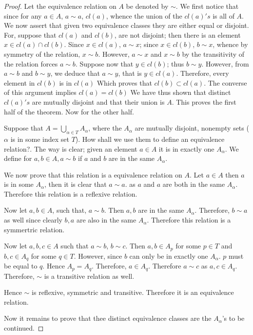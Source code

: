 \begin{proof}
 Let the equivalence relation on \( A  \) be denoted by \( \sim  \). We first notice that since for any \( a \in A  \), \( a \sim  a \), \( cl(a) \), whence the union of the \( cl(a)'s \) is all of \( A \).
 We now assert that given two equivalence classes they are either equal or disjoint. For, suppose that \( cl(a) \) and \( cl(b)  \), are not disjoint; then there is an element \( x \in  cl(a) \cap cl(b)\). Since
 \( x \in  cl(a) \), \( a \sim x  \); since \( x \in  cl(b) \), \( b \sim x \), whence by symmetry of the relation, \( x \sim  b \). However, \( a \sim  x \) and \( x \sim b \) by the transitivity of the relation forces \( a \sim b \). Suppose
now that \( y \in  cl(b) \); thus \( b \sim y \). However, from \( a \sim  b \) and \( b \sim  y \), we deduce that \( a \sim  y \), that is \( y \in   cl(a) \). Therefore, every element in \( cl(b) \) is in \( cl(a) \)
Which proves that \( cl(b) \subset cl(a) \). The converse of this argument implies \( cl(a) = cl(b) \)
We have thus shown that distinct \( cl(a)'s \) are mutually disjoint and that
their union is \( A \). This proves the first half of the theorem. Now for the other half.

Suppose that \( A = \bigcup_{\alpha  \in  T} A_{\alpha}  \), where the \( A_{\alpha } \) are mutually disjoint, nonempty sets (\( \alpha  \) is in some index set \( T \)). How shall we use them to define an equivalence
relation?. The way is clear; given an element \( a \in  A \) it is in exactly one \( A_{\alpha } \). We define for \( a,b \in A, a \sim b \)
if \( a  \) and \( b \) are in the same \( A_{\alpha } \). 

We now prove that this relation is a equivalence relation on \( A \). Let \( a \in  A \) then \( a  \) is in some \( A_{\alpha}\),  then it is clear that \( a \sim  a \).
as \( a  \) and \( a \) are both in the same \( A_{\alpha} \). Therefore this relation is a reflexive relation.

Now let \( a, b \in A \), such that, \( a \sim  b \). Then \( a,b  \) are in the same \( A_{\alpha } \). Therefore, \( b \sim  a \) as well since clearly \( b,a \) are also in the same \( A_{\alpha } \).
Therefore this relation is a symmertric relation.

Now let \( a, b, c \in A \) such that \( a \sim b   \), \( b \sim c \). Then \( a,b \in A_{p} \) for some \( p \in T \) and \( b,c \in A_{q} \) for some \( q \in T \).
However, since \( b  \) can only be in exactly one \( A_{\alpha } \). \( p \) must be equal to \( q \). Hence \( A_{p}  = A_{q} \). Therefore, \( a \in A_{q} \). Therefore \( a \sim c  \) as \( a,c \in  A_{q} \).
Therefore, \( \sim  \) is a transitive relation as well.

Hence \( \sim  \) is reflexive, symmetric and transitive. Therefore it is an equivalence relation.

Now it remains to prove that thee distinct equivalence classes are the \( A_{\alpha} \)'s to be continued.
\end{proof}

